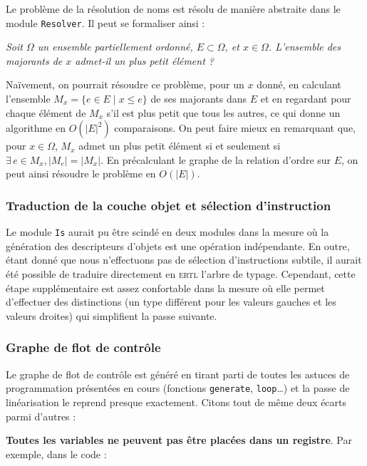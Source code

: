 \documentclass[11pt, a4paper]{article}
\newcommand{\prog}[1]{{\tt#1}}
\begin{document}
Le problème de la résolution de noms est résolu de manière abstraite dans le module \prog{Resolver}. Il peut se formaliser ainsi :

\bigskip

\textit{Soit $\Omega$ un ensemble partiellement ordonné, $E \subset \Omega$, et $x \in \Omega$. L'ensemble des majorants de $x$ admet-il un plus petit élément ? } \newline

Naïvement, on pourrait résoudre ce problème, pour un $x$ donné, en calculant l'ensemble $M_x = \{e \in E \;| \;x \leq e\}$ de ses majorants dans $E$ et en regardant pour chaque élément de $M_x$ s'il est plus petit que tous les autres, ce qui donne un algorithme en $O(|E|^2)$ comparaisons. On peut faire mieux en remarquant que, pour $x \in \Omega$, $M_x$ admet un plus petit élément si et seulement si $\exists \,e \in M_x, |M_e| = |M_x|$. En précalculant le graphe de la relation d'ordre sur $E$, on peut ainsi résoudre le problème en $O(|E|)$.


\subsubsection{Traduction de la couche objet et sélection d'instruction}

Le module \prog{Is} aurait pu être scindé en deux modules dans la mesure où la génération des descripteurs d'objets est une opération indépendante. En outre, étant donné que nous n'effectuons pas de sélection d'instructions subtile, il aurait été possible de traduire directement en \textsc{ertl} l'arbre de typage. Cependant, cette étape supplémentaire est assez confortable dans la mesure où elle permet d'effectuer des distinctions (un type différent pour les valeurs gauches et les valeurs droites) qui simplifient la passe suivante.

\subsubsection{Graphe de flot de contrôle}

Le graphe de flot de contrôle est généré en tirant parti de toutes les astuces de programmation présentées en cours (fonctions \prog{generate}, \prog{loop}\dots{}) et la passe de linéarisation le reprend presque exactement. Citons tout de même deux écarts parmi d'autres :

\medskip

\textbf{Toutes les variables ne peuvent pas être placées dans un registre}. Par exemple, dans le code :
\end{document}

